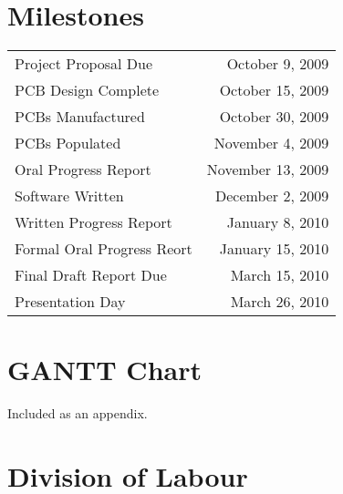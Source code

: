 \section{Milestones}

\begin{center}
  \begin{tabular}{|l|r|}
    \hline
    Project Proposal Due & October 9, 2009\\
    PCB Design Complete & October 15, 2009\\
    PCBs Manufactured & October 30, 2009\\
    PCBs Populated & November 4, 2009\\
    Oral Progress Report & November 13, 2009\\
    Software Written & December 2, 2009\\
    Written Progress Report & January 8, 2010\\
    Formal Oral Progress Reort & January 15, 2010\\
    Final Draft Report Due & March 15, 2010\\
    Presentation Day & March 26, 2010\\
    \hline
  \end{tabular}
\end{center}

\section{GANTT Chart}
Included as an appendix.

\section{Division of Labour}
